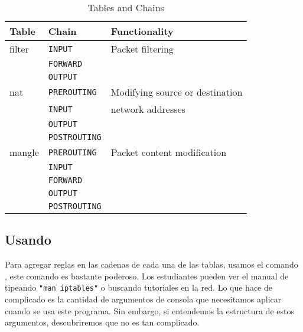 \begin{table}[htb]
        \centering
        \caption{\iptables Tables and Chains}
        \label{firewall:table:iptables}
        \centering

        \begin{tabular}{|l|l|l|}
                \hline
                \bfseries Table & \bfseries Chain & \bfseries Functionality \\
                \hline\hline
                filter          &    \texttt{INPUT}      & Packet filtering \\
                                &    \texttt{FORWARD}    & \\
                                &    \texttt{OUTPUT}      & \\
                \hline
                nat             &   \texttt{PREROUTING}    & Modifying source or destination \\
                                &   \texttt{INPUT}      & network addresses \\
                                &   \texttt{OUTPUT}      & \\
                                &   \texttt{POSTROUTING}   & \\
                \hline
                mangle          &   \texttt{PREROUTING}    & Packet content modification \\
                                &   \texttt{INPUT}      & \\
                                &   \texttt{FORWARD}     & \\
                                &   \texttt{OUTPUT}      & \\
                                &   \texttt{POSTROUTING}   & \\
                \hline
        \end{tabular}
\end{table}


\subsection{Usando \iptables}

Para agregar reglas en las cadenas de cada una de las tablas, usamos el comando \iptables, este comando es bastante poderoso.
Los estudiantes pueden ver el manual de \iptables tipeando \texttt{"man iptables"} o buscando tutoriales en la red.
Lo que hace de \iptables complicado es la cantidad de argumentos de consola que necesitamos aplicar cuando se usa este programa. Sin embargo, si entendemos la estructura de estos argumentos, descubriremos que \iptables no es tan complicado.

